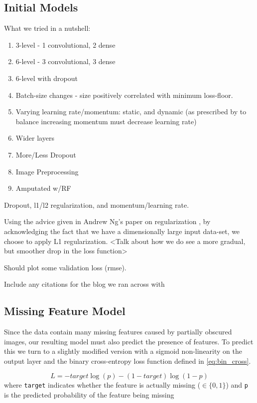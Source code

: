 \documentclass[journal]{IEEEtran}
\begin{document}
\subsection{Initial Models}
What we tried in a nutshell:
\begin{enumerate}
\item 3-level - 1 convolutional, 2 dense
\item 6-level - 3 convolutional, 3 dense
\item 6-level with dropout
\item Batch-size changes - size positively correlated with minimum loss-floor.
\item Varying learning rate/momentum: static, and dynamic (as prescribed by \cite{lasagnenesterov} to balance increasing momentum must decrease learning rate)
\item Wider layers
\item More/Less Dropout
\item Image Preprocessing
\item Amputated w/RF
\end{enumerate}

Dropout, l1/l2 regularization, and momentum/learning rate.


Using the advice given in Andrew Ng's paper on regularization \cite{ng2004feature}, by acknowledging the fact that we have a dimensionally large input data-set, we choose to apply L1 regularization. <Talk about how we do see a more gradual, but smoother drop in the loss function>

Should plot some validation loss (rmse).

Include any citations for the blog we ran across with \cite{dnouri}

\subsection{Missing Feature Model}\label{missing}
Since the data contain many missing features caused by partially obscured images, our resulting model must also predict the presence of features.  To predict this we turn to a slightly modified version with a sigmoid non-linearity on the output layer and the binary cross-entropy loss function defined in \cref{eq:bin_cross}.

\[\label{eq:bin_cross}
 L = -target \log(p) - (1 - target) \log(1 - p)
\]
where \texttt{target} indicates whether the feature is actually missing ($\in \{0,1\}$) and \texttt{p} is the predicted probability of the feature being missing
\end{document}
